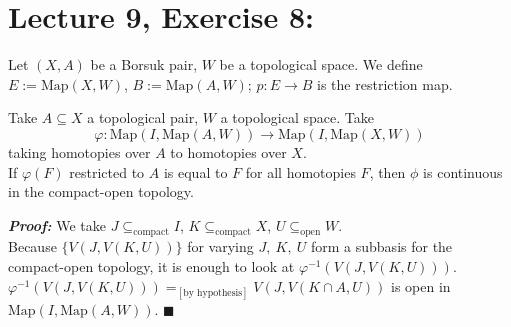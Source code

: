 \documentclass[11pt]{article}
\numberwithin{equation}{section}
\begin{document}
\section{\normalsize{Lecture 9, Exercise 8:}}
Let $(X,A)$ be a Borsuk pair, $W$ be a topological space. We define $E:=\text{Map}(X,W)$, $B:=\text{Map}(A,W)$; $p:E\rightarrow B$ is the restriction map. 

\begin{lem}\label{diamond}
	Take $A\subseteq X$ a topological pair, $W$ a topological space. Take $$\varphi:\text{Map}(I,\text{Map}(A,W))\rightarrow\text{Map}(I,\text{Map}(X,W))$$ taking homotopies over $A$ to homotopies over $X$. \\ 
	If $\varphi(F)$ restricted to $A$ is equal to $F$ for all homotopies $F$, then $\phi$ is continuous in the compact-open topology. 
\end{lem}
\textbf{\emph{Proof:}} We take $J\subseteq_{\text{compact}}I$, $K\subseteq_{\text{compact}}X$, $U\subseteq_{\text{open}}W$. \\ 
Because $\{V(J,V(K,U))\}$ for varying $J,\ K,\ U$ form a subbasis for the compact-open topology, it is enough to look at $\varphi^{-1}(V(J,V(K,U)))$.\\
$\varphi^{-1}(V(J,V(K,U))) =_{[\text{by hypothesis}]} V(J,V(K\cap A,U))$ is open in $\text{Map}(I,\text{Map}(A,W))$. $\blacksquare$
\end{document}
